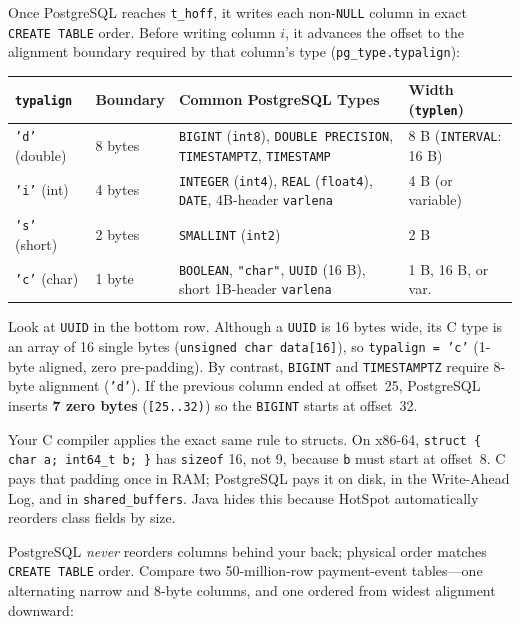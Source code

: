 Once PostgreSQL reaches \texttt{t\_hoff}, it writes each non-\texttt{NULL} column in exact \texttt{CREATE TABLE} order. Before writing column $i$, it advances the offset to the alignment boundary required by that column's type (\texttt{pg\_type.typalign}):

\begin{center}
\small
\begin{tabular}{@{}llp{6.6cm}l@{}}
\toprule
\textbf{\texttt{typalign}} & \textbf{Boundary} & \textbf{Common PostgreSQL Types} & \textbf{Width (\texttt{typlen})} \\
\midrule
\texttt{'d'} (double) & 8 bytes & \texttt{BIGINT} (\texttt{int8}), \texttt{DOUBLE PRECISION}, \texttt{TIMESTAMPTZ}, \texttt{TIMESTAMP} & 8 B (\texttt{INTERVAL}: 16 B) \\
\texttt{'i'} (int) & 4 bytes & \texttt{INTEGER} (\texttt{int4}), \texttt{REAL} (\texttt{float4}), \texttt{DATE}, 4B-header \texttt{varlena} & 4 B (or variable) \\
\texttt{'s'} (short) & 2 bytes & \texttt{SMALLINT} (\texttt{int2}) & 2 B \\
\texttt{'c'} (char) & 1 byte & \texttt{BOOLEAN}, \texttt{"char"}, \texttt{UUID} (16 B), short 1B-header \texttt{varlena} & 1 B, 16 B, or var. \\
\bottomrule
\end{tabular}
\end{center}

Look at \texttt{UUID} in the bottom row. Although a \texttt{UUID} is 16 bytes wide, its C type is an array of 16 single bytes (\texttt{unsigned char data[16]}), so \texttt{typalign = 'c'} (1-byte aligned, zero pre-padding). By contrast, \texttt{BIGINT} and \texttt{TIMESTAMPTZ} require 8-byte alignment (\texttt{'d'}). If the previous column ended at offset~25, PostgreSQL inserts \textbf{7 zero bytes} (\texttt{[25..32)}) so the \texttt{BIGINT} starts at offset~32.

Your C compiler applies the exact same rule to structs. On x86-64, \texttt{struct \{ char a; int64\_t b; \}} has \texttt{sizeof} 16, not 9, because \texttt{b} must start at offset~8. C pays that padding once in RAM; PostgreSQL pays it on disk, in the Write-Ahead Log, and in \texttt{shared\_buffers}. Java hides this because HotSpot automatically reorders class fields by size.

PostgreSQL \emph{never} reorders columns behind your back; physical order matches \texttt{CREATE TABLE} order. Compare two 50-million-row payment-event tables---one alternating narrow and 8-byte columns, and one ordered from widest alignment downward:

